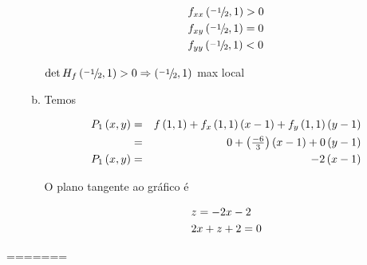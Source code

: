 \documentclass{book}
\begin{document}
\begin{enumerate}
\begin{sol}
\begin{enumerate}[(a)]
\[
\begin{gathered}
  f_{xx} \left( {{\raise0.5ex\hbox{$\scriptstyle { - 1}$}
\kern-0.1em/\kern-0.15em
\lower0.25ex\hbox{$\scriptstyle 2$}},1} \right) > 0 \hfill \\
  f_{xy} \left( {{\raise0.5ex\hbox{$\scriptstyle { - 1}$}
\kern-0.1em/\kern-0.15em
\lower0.25ex\hbox{$\scriptstyle 2$}},1} \right) = 0 \hfill \\
  f_{yy} \left( {{\raise0.5ex\hbox{$\scriptstyle { - 1}$}
\kern-0.1em/\kern-0.15em
\lower0.25ex\hbox{$\scriptstyle 2$}},1} \right) < 0 \hfill \\
\end{gathered}
\]

$\det H_f \left( {{\raise0.5ex\hbox{$\scriptstyle { - 1}$}
\kern-0.1em/\kern-0.15em
\lower0.25ex\hbox{$\scriptstyle 2$}},1} \right) > 0 \Rightarrow \left( {{\raise0.5ex\hbox{$\scriptstyle { - 1}$}
\kern-0.1em/\kern-0.15em
\lower0.25ex\hbox{$\scriptstyle 2$}},1} \right)$ max local

\newpage 

    \item Temos

\begin{eqnarray*}
  P_1 \left( {x,y} \right) &=& f\left( {1,1} \right) + f_x \left( {1,1} \right)\left( {x - 1} \right) + f_y \left( {1,1} \right)\left( {y - 1} \right) \hfill \\
   &=& 0 + \left( {\tfrac{{ - 6}}{3}} \right)\left( {x - 1} \right) + 0\left( {y - 1} \right) \hfill \\
  P_1 \left( {x,y} \right) &=&  - 2\left( {x - 1} \right) \hfill \\
\end{eqnarray*}

O plano tangente ao gr\'afico \'e

\[
\begin{gathered}
  z =  - 2x - 2 \hfill \\
  2x + z + 2 = 0 \hfill \\
\end{gathered}
\]


  \end{enumerate}
\end{sol}

\end{enumerate}
=======
\end{document}
